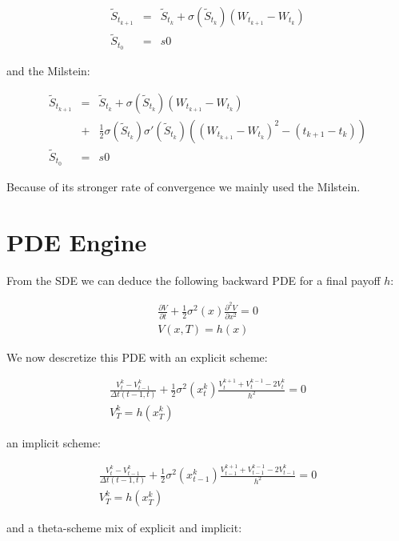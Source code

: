\documentclass[11pt,twoside,a4paper]{article}
\begin{document}
\begin{eqnarray*}
  \tilde{S}_{t_{k+1}} & = & \tilde{S}_{t_{k}} +  \sigma(\tilde{S}_{t_{k}}) \left( W_{t_{k+1}} - W_{t_{k}} \right) \\
	\tilde{S}_{t_{0}}   & = & s0
\end{eqnarray*}

and the Milstein:

\begin{eqnarray*}
  \tilde{S}_{t_{k+1}} & = & \tilde{S}_{t_{k}} +  \sigma(\tilde{S}_{t_{k}}) \left( W_{t_{k+1}} - W_{t_{k}} \right) \\
	& + & \frac{1}{2} \sigma(\tilde{S}_{t_{k}}) \sigma'(\tilde{S}_{t_{k}}) \left( \left( W_{t_{k+1}} - W_{t_{k}} \right)^2 - \left( t_{k+1} - t_{k}\right) \right)\\
	\tilde{S}_{t_{0}}   & = & s0
\end{eqnarray*}

Because of its stronger rate of convergence we mainly used the Milstein.

\section{PDE Engine}

From the SDE we can deduce the following backward PDE for a final payoff $h$:

\begin{eqnarray*}
  \frac{\partial V}{\partial t} + \frac{1}{2} \sigma^2(x) \frac{\partial^2 V}{\partial x^2} = 0\\
	V(x,T) = h(x)
\end{eqnarray*}

We now descretize this PDE with an explicit scheme:

\begin{eqnarray*}
  \frac{V^k_t - V^k_{t-1}}{\Delta t(t-1,t) } + \frac{1}{2} \sigma^2(x^k_t) \frac{V^{k+1}_t + V^{k-1}_{t} - 2 V^{k}_{t} }{h^2} = 0\\
	V^k_T = h(x^k_T)
\end{eqnarray*}

an implicit scheme:

\begin{eqnarray*}
  \frac{V^k_t - V^k_{t-1}}{\Delta t(t-1,t) } + \frac{1}{2} \sigma^2(x^k_{t-1}) \frac{V^{k+1}_{t-1} + V^{k-1}_{t-1} - 2 V^{k}_{t-1} }{h^2} = 0\\
	V^k_T = h(x^k_T)
\end{eqnarray*}

and a theta-scheme mix of explicit and implicit:
\end{document}
